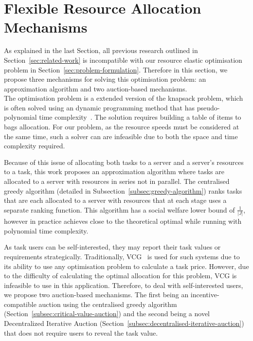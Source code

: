 \section{Flexible Resource Allocation Mechanisms}
\label{sec:flexible-resource-allocation-mechanisms}
As explained in the last Section, all previous research outlined in Section~\ref{sec:related-work} is incompatible
with our resource elastic optimisation problem in Section~\ref{sec:problem-formulation}. Therefore in this
section, we propose three mechanisms for solving this optimisation problem: an approximation algorithm and two
auction-based mechanisms. \\
The optimisation problem is a extended version of the knapsack problem, which is often solved using an dynamic
programming method that has pseudo-polynomial time complexity~\cite{toth1980dynamic}. The solution requires building
a table of items to bags allocation. For our problem, as the resource speeds must be considered at the same time, such
a solver can are infeasible due to both the space and time complexity required.

Because of this issue of allocating both tasks to a server and a server's resources to a task, this work proposes an
approximation algorithm where tasks are allocated to a server with resources in series not in parallel. The centralised
greedy algorithm (detailed in Subsection~\ref{subsec:greedy-algorithm}) ranks tasks that are each allocated to a server
with resources that at each stage uses a separate ranking function. This algorithm has a social welfare lower bound
of $\frac{1}{\left|J\right|}$, however in practice achieves close to the theoretical optimal while running with
polynomial time complexity.

As task users can be self-interested, they may report their task values or requirements strategically. Traditionally,
VCG~\cite{vickrey,Clarke,groves} is used for such systems due to its ability to use any optimisation problem to
calculate a task price. However, due to the difficulty of calculating the optimal allocation for this problem, VCG is
infeasible to use in this application. Therefore, to deal with self-interested users, we propose two auction-based
mechanisms. The first being an incentive-compatible auction using the centralised greedy algorithm
(Section~\ref{subsec:critical-value-auction}) and the second being a novel Decentralized Iterative
Auction (Section~\ref{subsec:decentralised-iterative-auction}) that does not require users to reveal the task value.

